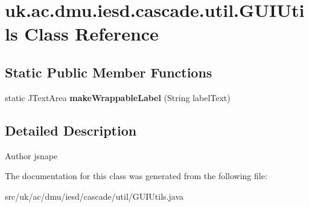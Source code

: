 \hypertarget{classuk_1_1ac_1_1dmu_1_1iesd_1_1cascade_1_1util_1_1_g_u_i_utils}{\section{uk.\-ac.\-dmu.\-iesd.\-cascade.\-util.\-G\-U\-I\-Utils Class Reference}
\label{classuk_1_1ac_1_1dmu_1_1iesd_1_1cascade_1_1util_1_1_g_u_i_utils}
}
\subsection*{Static Public Member Functions}
\begin{DoxyCompactItemize}
\item 
\hypertarget{classuk_1_1ac_1_1dmu_1_1iesd_1_1cascade_1_1util_1_1_g_u_i_utils_a766e93fff8a24bf57cfb92a3d2914d44}{static J\-Text\-Area {\bfseries make\-Wrappable\-Label} (String label\-Text)}\label{classuk_1_1ac_1_1dmu_1_1iesd_1_1cascade_1_1util_1_1_g_u_i_utils_a766e93fff8a24bf57cfb92a3d2914d44}

\end{DoxyCompactItemize}


\subsection{Detailed Description}
\begin{DoxyAuthor}{Author}
jsnape 
\end{DoxyAuthor}


The documentation for this class was generated from the following file\-:\begin{DoxyCompactItemize}
\item 
src/uk/ac/dmu/iesd/cascade/util/G\-U\-I\-Utils.\-java\end{DoxyCompactItemize}
